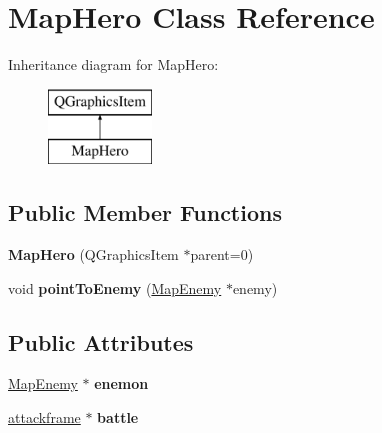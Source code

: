 \hypertarget{class_map_hero}{\section{Map\-Hero Class Reference}
\label{class_map_hero}
}
Inheritance diagram for Map\-Hero\-:\begin{figure}[H]
\begin{center}
\leavevmode
\includegraphics[height=2.000000cm]{class_map_hero}
\end{center}
\end{figure}
\subsection*{Public Member Functions}
\begin{DoxyCompactItemize}
\item 
\hypertarget{class_map_hero_aa5dd4f5162b14b9c4dca9fe6b53482bd}{{\bfseries Map\-Hero} (Q\-Graphics\-Item $\ast$parent=0)}\label{class_map_hero_aa5dd4f5162b14b9c4dca9fe6b53482bd}

\item 
\hypertarget{class_map_hero_a8337402793f86be45d7b139b328f4f81}{void {\bfseries point\-To\-Enemy} (\hyperlink{class_map_enemy}{Map\-Enemy} $\ast$enemy)}\label{class_map_hero_a8337402793f86be45d7b139b328f4f81}

\end{DoxyCompactItemize}
\subsection*{Public Attributes}
\begin{DoxyCompactItemize}
\item 
\hypertarget{class_map_hero_a130f5008f4e8b74f51d7a109bb870322}{\hyperlink{class_map_enemy}{Map\-Enemy} $\ast$ {\bfseries enemon}}\label{class_map_hero_a130f5008f4e8b74f51d7a109bb870322}

\item 
\hypertarget{class_map_hero_a66cef0ed826bc7a9e2861354bf6f44c3}{\hyperlink{classattackframe}{attackframe} $\ast$ {\bfseries battle}}\label{class_map_hero_a66cef0ed826bc7a9e2861354bf6f44c3}

\end{DoxyCompactItemize}
